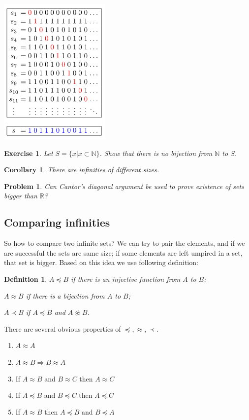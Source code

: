 \documentclass[11pt,a5paper]{article}
\newtheorem{definition}{Definition}
\newtheorem{exercise}{Exercise}
\newtheorem{problem}{Problem}
\newtheorem*{corollary}{Corollary}
\begin{document}
\includegraphics[scale=0.8]{cda}
\begin{exercise} Let $S=\{x|x\subset \mathbb{N}\}$. Show that there is no bijection from $\mathbb{N}$ to $S$.
\end{exercise}
\begin{corollary} There are infinities of different sizes.
\end{corollary}
\begin{problem} Can Cantor's diagonal argument be used to prove existence of sets bigger than $\mathbb{R}$?
\end{problem}

\subsection*{Comparing infinities}

\noindent So how to compare two infinite sets? We can try to pair the elements, and if we are successful the sets are same size; if some elements are left umpired in a set, that set is bigger. Based on this idea we use following definition:

\begin{definition}
$A\preceq B$ if there is an injective function from $A$ to $B$;

$A\approx B$ if there is a bijection from $A$ to $B$; 

$A\prec B$ if $A\preceq B$ and $A\not\approx B$.
\end{definition}


\noindent There are several obvious properties of $\preceq, \approx, \prec$.
\begin{enumerate}
  \item $A\approx A$
  \item $A\approx B \Rightarrow B\approx A$
  \item If $A\approx B$ and $B\approx C$ then $A\approx C$
  \item If $A\preceq B$ and $B\preceq C$ then $A\preceq C$
  \item If $A\approx B$ then $A\preceq B$ and $B\preceq A$
\end{enumerate}
\end{document}
